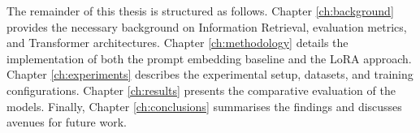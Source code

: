 The remainder of this thesis is structured as follows. Chapter \ref{ch:background} provides the necessary background on Information Retrieval, evaluation metrics, and Transformer architectures. Chapter \ref{ch:methodology} details the implementation of both the prompt embedding baseline and the LoRA approach. Chapter \ref{ch:experiments} describes the experimental setup, datasets, and training configurations. Chapter \ref{ch:results} presents the comparative evaluation of the models. Finally, Chapter \ref{ch:conclusions} summarises the findings and discusses avenues for future work.
